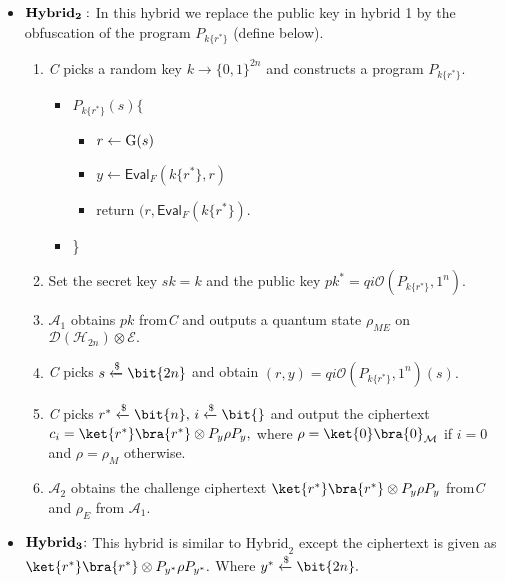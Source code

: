 \begin{itemize}
\item ${\bf Hybrid_2}:$ In this hybrid we replace the public key in hybrid 1 by the obfuscation of the program $P_{k\{r^*\}}$ (define below).
\begin{enumerate}
\item{\em C} picks a random key $k\rightarrow \{0,1\}^{2n}$ and constructs a program $P_{k\{r^*\}}.$
\begin{itemize}
\item[] $P_{k\{r^*\}}(s) \{$
\begin{itemize}
\item[] $r\leftarrow {\rm G}(s)$
\item[] $y \leftarrow \textsf{Eval}_F(k\{r^*\},r)$
\item[] return $(r,\textsf{Eval}_F(k\{r^*\}).$
\end{itemize}
\item[] \}
\end{itemize}
 \item Set the secret key $sk=k$ and the public key $pk^*=qi\mathcal{O}(P_{k\{r^*\}},1^n).$
 \item  $\mathcal{A}_1$ obtains $pk$ from{\em C} and outputs a quantum state  $\rho_{ME}$ on $\mathcal{D}(\mathcal{H}_{2n}) \otimes \mathcal{E}.$
 \item {\em C} picks $s\xleftarrow[]{\$} \bit{2n}$ and obtain $(r,y)= qi\mathcal{O}(P_{k\{r^*\}},1^n)(s).$
 \item{\em C} picks $r^* \xleftarrow[]{\$} \bit{n},\, i \xleftarrow[]{\$} \bit{}$ and output the ciphertext $c_i=\ket{r^*}\bra{r^*} \otimes P_y \rho P_y,$ where $\rho=\ket{0}\bra{0}_\mathcal{M}$ if $i=0$ and  $\rho=\rho_M$ otherwise.
\item  $\mathcal{A}_2$ obtains the challenge ciphertext $\ket{r^*}\bra{r^*} \otimes P_y \rho P_y$ from{\em C} and $\rho_E$ from $\mathcal{A}_1.$
\end{enumerate}
\end{itemize}

\begin{itemize}
\item ${\bf Hybrid_3}\hspace{-0.09cm}:$ This hybrid is similar to $\mbox{Hybrid}_2$ except the ciphertext is given as $\ket{r^*}\bra{r^*} \otimes P_{y^*} \rho P_{y^*}.$ Where $y^* \xleftarrow[]{\$} \bit{2n}.$
\end{itemize}

